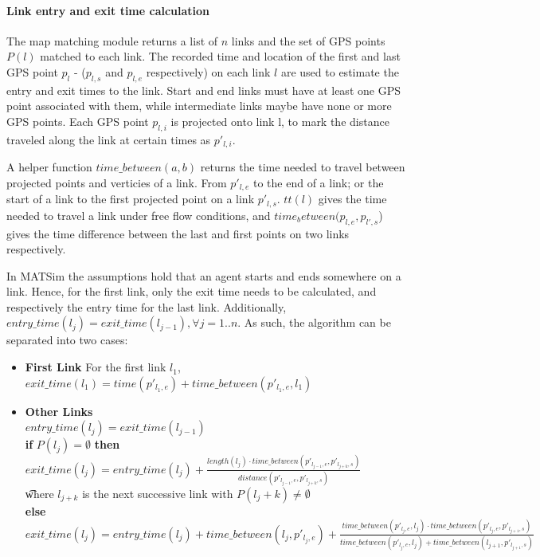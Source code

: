 \paragraph{Link entry and exit time calculation}
The map matching module returns a list of $n$ links and the set of GPS points $P(l)$ matched to each link. The recorded time and location of the first and last GPS point $p_{l}$ - ($p_{l,s}$ and $p_{l,e}$ respectively) on each link $l$ are used to estimate the entry and exit times to the link. 
Start and end links must have at least one GPS point associated with them, while intermediate links maybe have none or more GPS points. 
Each GPS point $p_{l,i}$ is projected onto link l, to mark the distance traveled along the link at certain times as $p'_{l,i}$.

A helper function $time\_between(a,b)$ returns the time needed to travel between projected points and verticies of a link. From $p'_{l,e}$ to the end of a link; or the start of a link to the first projected point on a link $p'_{l,s}$. 
$tt(l)$ gives the time needed to travel a link under free flow conditions, and $time_between(p_{l,e}, p_{l',s}$) gives the time difference between the last and first points on two links respectively.

In MATSim the assumptions hold that an agent starts and ends somewhere on a link. Hence, for the first link, only the exit time needs to be calculated, and respectively the entry time for the last link. Additionally, $entry\_time(l_{j}) = exit\_time(l_{j-1}),  \forall j = 1..n$. As such, the algorithm can be separated into two cases:
\begin{itemize}
	\item \textbf{First Link} For the first link $l_1$, $exit\_time(l_1) = time(p'_{l_1,e}) + time\_between(p'_{l_1,e}, l_1)$
	\item \textbf{Other Links} \\
		$entry\_time(l_{j}) = exit\_time(l_{j-1}) $ \\
		\textbf{if} $P(l_j) = \emptyset$ \textbf{then} $exit\_time(l_j) = entry\_time(l_j) + 
										\frac{length(l_j) \cdot time\_between(p'_{l_{j-1},e}, p'_{l_{j+k},s})}{distance(p'_{l_{j-1},e}, p'_{l_{j+k},s})} $ \\
										\t where $l_{j+k}$ is the next successive link with $P(l_j+k) \neq \emptyset$  \\
		\textbf{else}  $exit\_time(l_j) = entry\_time(l_j) + time\_between(l_{j}, p'_{l_j,e}) + \frac{time\_between(p'_{l_j,e}, l_{j}) \cdot time\_between(p'_{l_j,e}, p'_{l_{j+1},s})} 
					{time\_between(p'_{l_j,e}, l_{j}) + time\_between(l_{j+1},p'_{l_{j+1},s})}   $ \\
\end{itemize}

